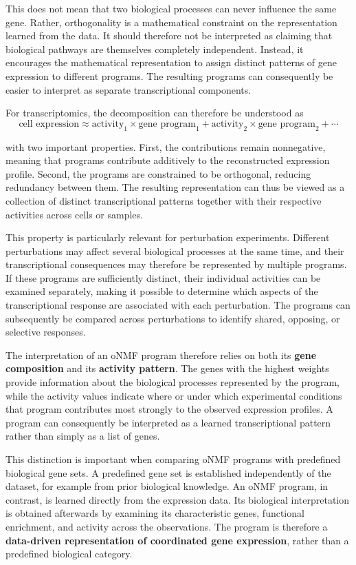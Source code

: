 \documentclass[11pt,a4paper]{article}
\begin{document}
This does not mean that two biological processes can never influence the same gene. Rather, orthogonality is a mathematical constraint on the representation learned from the data. It should therefore not be interpreted as claiming that biological pathways are themselves completely independent. Instead, it encourages the mathematical representation to assign distinct patterns of gene expression to different programs. The resulting programs can consequently be easier to interpret as separate transcriptional components.

For transcriptomics, the decomposition can therefore be understood as
\[
\text{cell expression}
\approx
\text{activity}_1\times\text{gene program}_1
+
\text{activity}_2\times\text{gene program}_2
+\cdots
\]

with two important properties. First, the contributions remain nonnegative, meaning that programs contribute additively to the reconstructed expression profile. Second, the programs are constrained to be orthogonal, reducing redundancy between them. The resulting representation can thus be viewed as a collection of distinct transcriptional patterns together with their respective activities across cells or samples.

This property is particularly relevant for perturbation experiments. Different perturbations may affect several biological processes at the same time, and their transcriptional consequences may therefore be represented by multiple programs. If these programs are sufficiently distinct, their individual activities can be examined separately, making it possible to determine which aspects of the transcriptional response are associated with each perturbation. The programs can subsequently be compared across perturbations to identify shared, opposing, or selective responses.

The interpretation of an oNMF program therefore relies on both its \textbf{gene composition} and its \textbf{activity pattern}. The genes with the highest weights provide information about the biological processes represented by the program, while the activity values indicate where or under which experimental conditions that program contributes most strongly to the observed expression profiles. A program can consequently be interpreted as a learned transcriptional pattern rather than simply as a list of genes.

This distinction is important when comparing oNMF programs with predefined biological gene sets. A predefined gene set is established independently of the dataset, for example from prior biological knowledge. An oNMF program, in contrast, is learned directly from the expression data. Its biological interpretation is obtained afterwards by examining its characteristic genes, functional enrichment, and activity across the observations. The program is therefore a \textbf{data-driven representation of coordinated gene expression}, rather than a predefined biological category.
\end{document}
